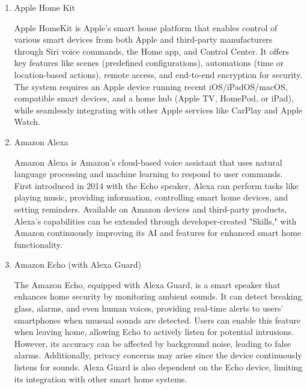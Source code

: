 \documentclass[conference]{IEEEtran}
\begin{document}
\begin{enumerate}[label=\arabic*]
    \item Apple Home Kit\par
    \vspace{0.3em}    
    Apple HomeKit is Apple's smart home platform that enables control of various smart devices from both Apple and third-party manufacturers through Siri voice commands, the Home app, and Control Center. It offers key features like scenes (predefined configurations), automations (time or location-based actions), remote access, and end-to-end encryption for security. The system requires an Apple device running recent iOS/iPadOS/macOS, compatible smart devices, and a home hub (Apple TV, HomePod, or iPad), while seamlessly integrating with other Apple services like CarPlay and Apple Watch.
    
    \vspace{1em}

    \item Amazon Alexa\par
    \vspace{0.3em}
    Amazon Alexa is Amazon's cloud-based voice assistant that uses natural language processing and machine learning to respond to user commands. First introduced in 2014 with the Echo speaker, Alexa can perform tasks like playing music, providing information, controlling smart home devices, and setting reminders. Available on Amazon devices and third-party products, Alexa's capabilities can be extended through developer-created "Skills," with Amazon continuously improving its AI and features for enhanced smart home functionality.
    
    \vspace{1em}

    \item Amazon Echo (with Alexa Guard)\par
    \vspace{0.3em}
    The Amazon Echo, equipped with Alexa Guard, is a smart speaker that enhances home security by monitoring ambient sounds. It can detect breaking glass, alarms, and even human voices, providing real-time alerts to users’ smartphones when unusual sounds are detected. Users can enable this feature when leaving home, allowing Echo to actively listen for potential intrusions. However, its accuracy can be affected by background noise, leading to false alarms. Additionally, privacy concerns may arise since the device continuously listens for sounds. Alexa Guard is also dependent on the Echo device, limiting its integration with other smart home systems.
    

\end{enumerate}
\end{document}
